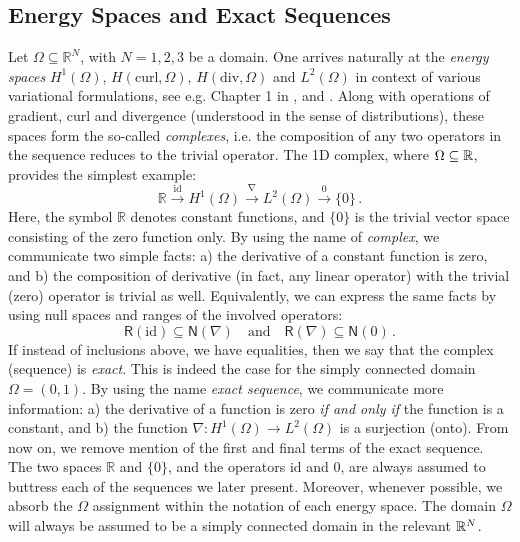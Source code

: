 \subsection{Energy Spaces and Exact Sequences}
\label{sec:Exactsequences}
Let $\Omega\subseteq\mathbb{R}^N$, with $N=1,2,3$ be a domain.
One arrives naturally at the \textit{energy spaces} $H^1(\Omega)$, $H(\text{curl},\Omega)$, $H(\text{div},\Omega)$ and $L^2(\Omega)$ in context of various variational formulations, see e.g. Chapter 1 in \citet{hpbook2}, \citet{DemkowiczGopalakrishnan13_2} and \citet{DemkowiczClosedRange}.
Along with operations of gradient, curl and divergence (understood in the sense of distributions), these spaces form the so-called \textit{complexes}, i.e. the composition of any two operators in the sequence reduces to the trivial operator.
The 1D complex, where $\Omega\subseteq\mathbb{R}$, provides the simplest example:
\begin{equation*}
	\mathbb{R} \stackrel{\text{id}}{\longrightarrow} H^1(\Omega) \stackrel{\nabla}{\longrightarrow} L^2(\Omega)
	\stackrel{0}{\longrightarrow} \{ 0 \}\,.
	\label{eq:1D_exact_sequence}
\end{equation*}
Here, the symbol $\mathbb{R}$ denotes constant functions, and $\{0\}$ is the trivial vector space consisting of the zero function only. By using the name of \textit{complex}, we communicate two simple facts: a) the derivative of a constant function is zero, and b) the composition of derivative (in fact, any linear operator) with the trivial (zero) operator is trivial as well. Equivalently, we can express the same facts by using null spaces and ranges of the involved operators:
\begin{equation*}
	\mathsf{R}(\text{id}) \subseteq \mathsf{N}(\nabla) \quad \text{and} \quad
	\mathsf{R}(\nabla) \subseteq \mathsf{N}(0) \, .
\end{equation*}
If instead of inclusions above, we have equalities, then we say that the complex (sequence) is \textit{exact}. This is indeed the case for the simply connected domain $\Omega = (0,1)$. 
By using the name \textit{exact sequence}, we communicate more information: a) the derivative of a function is zero \textit{if and only if} the function is a constant, and b) the function $\nabla : H^1(\Omega) \to L^2(\Omega)$ is a surjection (onto). From now on, we remove mention of the first and final terms of the exact sequence. The two spaces $\mathbb{R}$ and $\{0\}$, and the operators $\text{id}$ and $0$, are always assumed to buttress each of the sequences we later present. Moreover, whenever possible, we absorb the $\Omega$ assignment within the notation of each energy space. The domain $\Omega$ will always be assumed to be a simply connected domain in the relevant $\mathbb{R}^N$.

